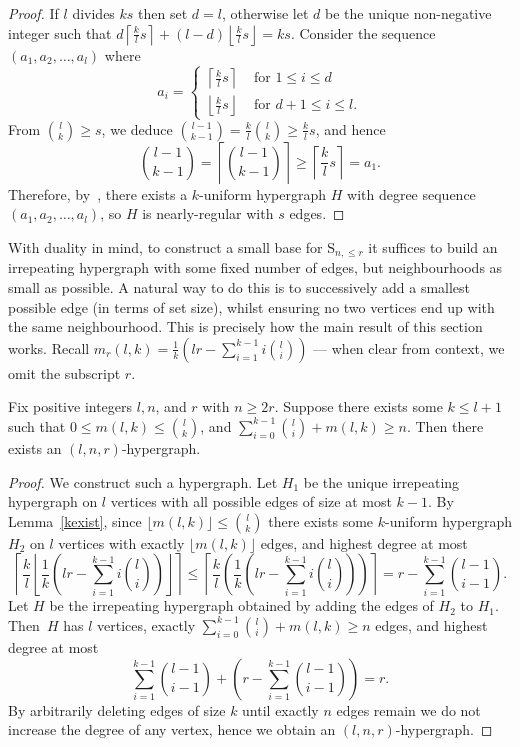 \documentclass[ALCO,published]{cedram}
\renewcommand\S{\mathrm{S}}
\begin{document}
\begin{proof}
If $l$ divides $ks$ then set $d=l$, otherwise let $d$ be the unique non-negative integer such that $d\left\lceil\frac{k}{l}s\right\rceil+(l-d)\left\lfloor\frac{k}{l}s\right\rfloor=ks$. Consider the sequence $(a_1,a_2,\dots,a_l)$ where $$a_i=\begin{cases}\left\lceil\frac{k}{l}s\right\rceil&\text{ for $1\leq i\leq d$}\\\left\lfloor\frac{k}{l}s\right\rfloor&\text{ for $d+1\leq i\leq l$}.\end{cases}$$ From $\binom{l}{k}\geq s$, we deduce $\binom{l-1}{k-1}=\frac{k}{l}\binom{l}{k}\geq\frac{k}{l}s$, and hence $$\binom{l-1}{k-1}=\left\lceil\binom{l-1}{k-1}\right\rceil\geq \left\lceil\frac{k}{l}s\right\rceil =a_1.$$ Therefore, by~\cite[Theorem 2.1]{beh}, there exists a $k$-uniform hypergraph $H$ with degree sequence $(a_1,a_2,\dots, a_l)$, so $H$ is nearly-regular with $s$ edges.
\end{proof}

With duality in mind, to construct a small base for $\S_{n,\leq r}$ it suffices to build an irrepeating hypergraph with some fixed number of edges, but neighbourhoods as small as possible. A natural way to do this is to successively add a smallest possible edge (in terms of set size), whilst ensuring no two vertices end up with the same neighbourhood. This is precisely how the main result of this section works. Recall $m_r(l,k)=\frac{1}{k}\left(lr-\sum_{i=1}^{k-1}i\binom{l}{i}\right)$ --- when clear from context, we omit the subscript $r$.

\begin{prop}\label{hypexist}
Fix positive integers $l,n$, and $r$ with $n\geq 2r$. Suppose there exists some $k\leq l+1$ such that $0\leq m(l,k)\leq\binom{l}{k}$, and $\sum_{i=0}^{k-1}\binom{l}{i}+m(l,k)\geq n.$
Then there exists an $(l,n,r)$-hypergraph.
\end{prop}

\begin{proof}
We construct such a hypergraph. Let $H_1$ be the unique irrepeating hypergraph on $l$ vertices with all possible edges of size at most $k-1$. 
By Lemma~\ref{kexist}, since $\lfloor m(l,k)\rfloor\leq \binom{l}{k}$ there exists some $k$-uniform hypergraph $H_2$ on $l$ vertices with exactly $\lfloor m(l,k)\rfloor$ edges, and highest degree at most $$\left\lceil \frac{k}{l}\left\lfloor \frac{1}{k}\left(lr-\sum_{i=1}^{k-1}i\binom{l}{i}\right)\right\rfloor\right\rceil \leq \left\lceil \frac{k}{l}\left( \frac{1}{k}\left(lr-\sum_{i=1}^{k-1}i\binom{l}{i}\right)\right)\right\rceil = r-\sum_{i=1}^{k-1}\binom{l-1}{i-1}.$$ Let $H$ be the irrepeating hypergraph obtained by adding the edges of $H_2$ to $H_1$. Then~$H$ has $l$ vertices, exactly $\sum_{i=0}^{k-1}\binom{l}{i}+m(l,k)\geq n$ edges, and highest degree at most $$\sum_{i=1}^{k-1}\binom{l-1}{i-1} +\left(r-\sum_{i=1}^{k-1}\binom{l-1}{i-1}\right)=r.$$ 
By arbitrarily deleting edges of size $k$ until exactly $n$ edges remain we do not increase the degree of any vertex, hence we obtain an $(l,n,r)$-hypergraph.
\end{proof}
\end{document}

